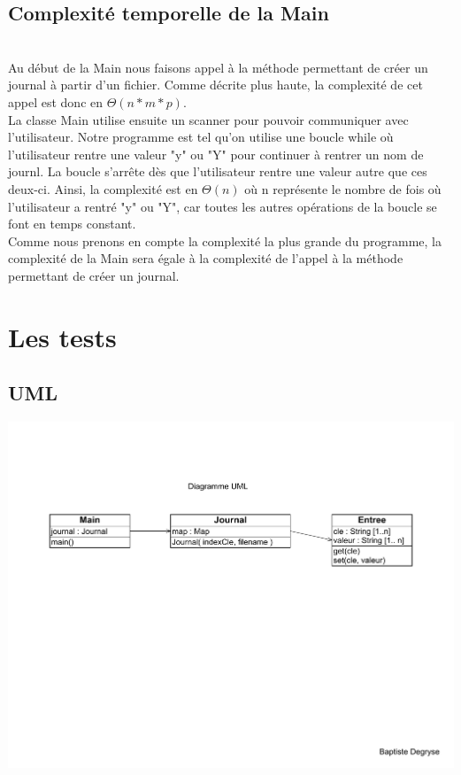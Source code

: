 \documentclass[a4paper]{article}
\begin{document}
\subsection*{Complexité temporelle de la Main}
\\
Au début de la Main nous faisons appel à la méthode permettant de créer un journal à partir d'un fichier. Comme décrite plus haute, la complexité de cet appel est donc en $\Theta(n*m*p)$. 
\\
La classe Main utilise ensuite un scanner pour pouvoir communiquer avec l'utilisateur. Notre programme est tel qu'on utilise une boucle while où l'utilisateur rentre une valeur "y" ou "Y" pour continuer à rentrer un nom de journl. La boucle s'arrête dès que l'utilisateur rentre une valeur autre que ces deux-ci. Ainsi, la complexité est en $\Theta(n)$ où n représente le nombre de fois où l'utilisateur a rentré "y" ou "Y", car toutes les autres opérations de la boucle se font en temps constant. 
\\
Comme nous prenons en compte la complexité la plus grande du programme, la complexité de la Main sera égale à la complexité de l'appel à la méthode permettant de créer un journal. 
\\
\section*{Les tests}



\subsection*{UML}

\includegraphics[scale=0.4]{diagrammeUML.PDF}
\end{document}
